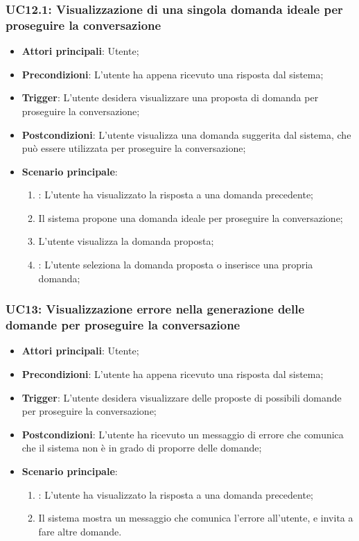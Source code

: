 \hypertarget{UC12.1}{}
\subsubsection{UC12.1: Visualizzazione di una singola domanda ideale per proseguire la conversazione}
\begin{itemize}
    \item \textbf{Attori principali}: Utente;
    \item \textbf{Precondizioni}: L'utente ha appena ricevuto una risposta dal sistema;
    \item \textbf{Trigger}: L'utente desidera visualizzare una proposta di domanda per proseguire la conversazione;
    \item \textbf{Postcondizioni}: L'utente visualizza una domanda suggerita dal sistema, che può essere utilizzata per proseguire la conversazione;
    \item \textbf{Scenario principale}:
    \begin{enumerate}
        \item {}: L'utente ha visualizzato la risposta a una domanda precedente;
        \item Il sistema propone una domanda ideale per proseguire la conversazione;
        \item L'utente visualizza la domanda proposta;
        \item {}: L'utente seleziona la domanda proposta o inserisce una propria domanda;
    \end{enumerate}
\end{itemize}

\hypertarget{UC13}{}
\subsubsection{UC13: Visualizzazione errore nella generazione delle domande per proseguire la conversazione}
\begin{itemize}
    \item \textbf{Attori principali}: Utente;
    \item \textbf{Precondizioni}: L'utente ha appena ricevuto una risposta dal sistema;
    \item \textbf{Trigger}: L'utente desidera visualizzare delle proposte di possibili domande per proseguire la conversazione;
    \item \textbf{Postcondizioni}: L'utente ha ricevuto un messaggio di errore che comunica che il sistema non è in grado di proporre delle domande;
    \item \textbf{Scenario principale}:
    \begin{enumerate}
        \item {}: L'utente ha visualizzato la risposta a una domanda precedente;
        \item Il sistema mostra un messaggio che comunica l'errore all'utente, e invita a fare altre domande.
    \end{enumerate}
\end{itemize}

